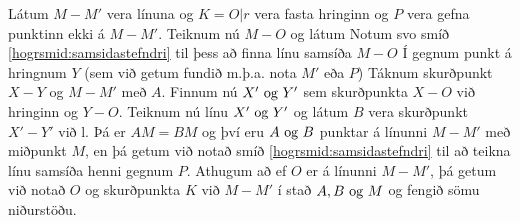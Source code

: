 \begin{frame}
  \begin{hogrsmid} \label{hogrsmid:samsida}
    Látum \(M-M'\) vera línuna og \(K = O|r\) vera fasta hringinn og \(P\)
    vera gefna punktinn ekki á \(M-M'\).
    Teiknum nú \(M-O\) og látum
    Notum svo smíð \ref{hogrsmid:samsidastefndri} til þess
    að finna línu samsíða \(M-O\) Í gegnum punkt á hringnum \(Y\)
    (sem við getum fundið m.þ.a. nota \(M'\) eða \(P\))
    Táknum skurðpunkt \(X-Y\) og \(M-M'\) með \(A\).
    Finnum nú \(X' \text{ og } Y'\) sem skurðpunkta \(X-O\) við hringinn og \(Y-O\).
    Teiknum nú línu \(X' \text{ og } Y'\) og látum \(B\) vera skurðpunkt \(X'-Y'\) við l.
    Þá er \(AM = BM\) og því eru \(A \text{ og } B\) punktar á línunni \(M-M'\) með miðpunkt
    \(M\), en þá getum við notað smíð \ref{hogrsmid:samsidastefndri}
    til að teikna línu samsíða henni gegnum \(P\).
    Athugum að ef \(O\) er á línunni \(M-M'\), þá getum við  notað
    \(O\) og skurðpunkta \(K\) við \(M-M'\) í stað \(A, B \text{ og } M\) og fengið
    sömu niðurstöðu.
  \end{hogrsmid}
\end{frame}

